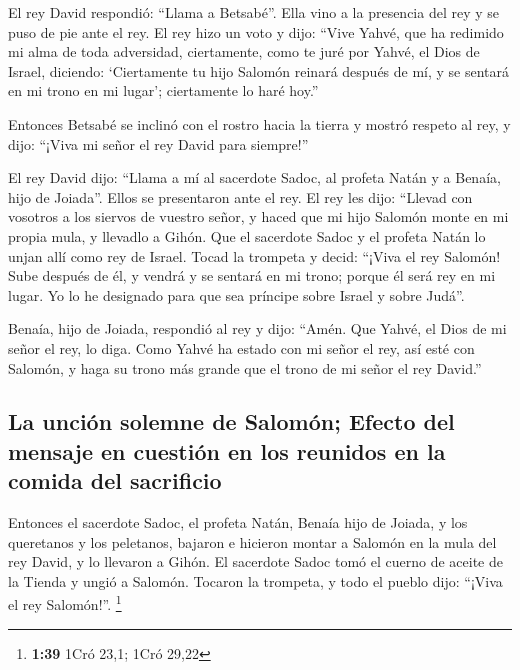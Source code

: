 \begin{paracol}{2}
 El rey David respondió: ``Llama a Betsabé''. Ella vino a
la presencia del rey y se puso de pie ante el rey.  El
rey hizo un voto y dijo: ``Vive Yahvé, que ha redimido mi alma de toda
adversidad,  ciertamente, como te juré por Yahvé, el Dios
de Israel, diciendo: `Ciertamente tu hijo Salomón reinará después de mí,
y se sentará en mi trono en mi lugar'; ciertamente lo haré hoy.''

 Entonces Betsabé se inclinó con el rostro hacia la
tierra y mostró respeto al rey, y dijo: ``¡Viva mi señor el rey David
para siempre!''

 El rey David dijo: ``Llama a mí al sacerdote Sadoc, al
profeta Natán y a Benaía, hijo de Joiada''. Ellos se presentaron ante el
rey.  El rey les dijo: ``Llevad con vosotros a los
siervos de vuestro señor, y haced que mi hijo Salomón monte en mi propia
mula, y llevadlo a Gihón.  Que el sacerdote Sadoc y el
profeta Natán lo unjan allí como rey de Israel. Tocad la trompeta y
decid: ``¡Viva el rey Salomón!  Sube después de él, y
vendrá y se sentará en mi trono; porque él será rey en mi lugar. Yo lo
he designado para que sea príncipe sobre Israel y sobre Judá''.

 Benaía, hijo de Joiada, respondió al rey y dijo: ``Amén.
Que Yahvé, el Dios de mi señor el rey, lo diga.  Como
Yahvé ha estado con mi señor el rey, así esté con Salomón, y haga su
trono más grande que el trono de mi señor el rey David.''

\hypertarget{la-unciuxf3n-solemne-de-salomuxf3n-efecto-del-mensaje-en-cuestiuxf3n-en-los-reunidos-en-la-comida-del-sacrificio}{%
\subsection{La unción solemne de Salomón; Efecto del mensaje en cuestión
en los reunidos en la comida del
sacrificio}\label{la-unciuxf3n-solemne-de-salomuxf3n-efecto-del-mensaje-en-cuestiuxf3n-en-los-reunidos-en-la-comida-del-sacrificio}}

 Entonces el sacerdote Sadoc, el profeta Natán, Benaía
hijo de Joiada, y los queretanos y los peletanos, bajaron e hicieron
montar a Salomón en la mula del rey David, y lo llevaron a Gihón.
 El sacerdote Sadoc tomó el cuerno de aceite de la Tienda
y ungió a Salomón. Tocaron la trompeta, y todo el pueblo dijo: ``¡Viva
el rey Salomón!''. \footnote{\textbf{1:39} 1Cró 23,1; 1Cró 29,22}


\end{paracol}
